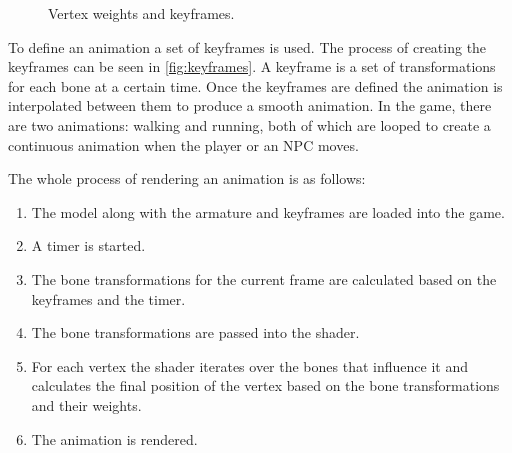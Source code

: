 \begin{figure}[H]
    \caption{Vertex weights and keyframes.}
\end{figure}

To define an animation a set of keyframes is used.
The process of creating the keyframes can be seen in \autoref{fig:keyframes}.
A keyframe is a set of transformations for each bone at a certain time.
Once the keyframes are defined the animation is interpolated between them to produce a smooth animation.
In the game, there are two animations: walking and running, both of which are looped to create a continuous animation when the player or an NPC moves.


The whole process of rendering an animation is as follows:
\begin{enumerate}
    \item The model along with the armature and keyframes are loaded into the game.
    \item A timer is started.
    \item The bone transformations for the current frame are calculated based on the keyframes and the timer.
    \item The bone transformations are passed into the shader.
    \item For each vertex the shader iterates over the bones that influence it and calculates the final position of the vertex based on the bone transformations and their weights.
    \item The animation is rendered.
\end{enumerate}